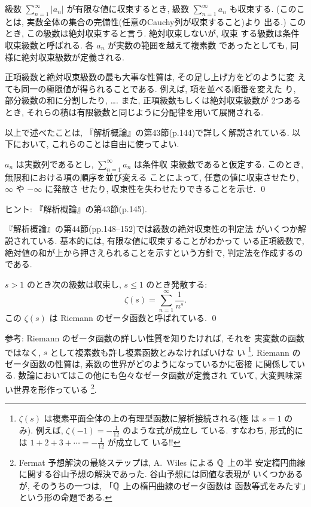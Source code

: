 \documentclass[12pt,twoside]{jarticle}
\begin{document}
級数 $\sum\limits_{n=1}^\infty |a_n|$ が有限な値に収束するとき, 級数 %
$\sum\limits_{n=1}^\infty a_n$ も収束する. %
(このことは, 実数全体の集合の完備性(任意のCauchy列が収束すること)より
出る.) このとき, この級数は絶対収束すると言う. 絶対収束しないが, 収束
する級数は条件収束級数と呼ばれる. 各 $a_n$ が実数の範囲を越えて複素数
であったとしても, 同様に絶対収束級数が定義される.

正項級数と絶対収束級数の最も大事な性質は, その足し上げ方をどのように変
えても同一の極限値が得られることである. 例えば, 項を並べる順番を変えた
り, 部分級数の和に分割したり, …. また, 正項級数もしくは絶対収束級数が
2つあるとき, それらの積は有限級数と同じように分配律を用いて展開される.

以上で述べたことは, 『解析概論』の第43節(p.144)で詳しく解説されている. 
以下において, これらのことは自由に使ってよい.

\begin{question}[Dirichlet]
  $a_n$ は実数列であるとし, $\sum\limits_{n=1}^\infty a_n$ は条件収
  束級数であると仮定する. このとき, 無限和における項の順序を並び変える
  ことによって, 任意の値に収束させたり, $\infty$ や $-\infty$ に発散さ
  せたり, 収束性を失わせたりできることを示せ.
  \qed
\end{question}

\noindent ヒント: 『解析概論』の第43節(p.145).

\medskip『解析概論』の第44節(pp.148--152)では級数の絶対収束性の判定法
がいくつか解説されている. 基本的には, 有限な値に収束することがわかって
いる正項級数で, 絶対値の和が上から押さえられることを示すという方針で, 
判定法を作成するのである.

\begin{question}[Riemannのゼータ函数]
  $s>1$ のとき次の級数は収束し, $s\le1$ のとき発散する:
  \[
    \zeta(s) = \sum_{n=1}^\infty \frac{1}{n^s}.
  \]
  この $\zeta(s)$ は Riemann のゼータ函数と呼ばれている. \qed
\end{question}

\noindent 参考: Riemann のゼータ函数の詳しい性質を知りたければ, それを
実変数の函数ではなく, $s$ として複素数も許し複素函数とみなければいけな
い%
\footnote{$\zeta(s)$ は複素平面全体の上の有理型函数に解析接続される(極
  は $s=1$ のみ). 例えば, $\zeta(-1)=-\frac{1}{12}$ のような式が成立し
  ている. すなわち, 形式的には $1+2+3+\cdots=-\frac{1}{12}$ が成立して
  いる!! }. %
Riemann のゼータ函数の性質は, 素数の世界がどのようになっているかに密接
に関係している. 数論においてはこの他にも色々なゼータ函数が定義され
ていて, 大変興味深い世界を形作っている%
\footnote{Fermat 予想解決の最終ステップは, A.~Wiles による ${\mathbb Q}$ 上の半
  安定楕円曲線に関する谷山予想の解決であった. 谷山予想には同値な表現が
  いくつかあるが, そのうちの一つは, 「${\mathbb Q}$ 上の楕円曲線のゼータ函数は
  函数等式をみたす」という形の命題である.}.
\end{document}
